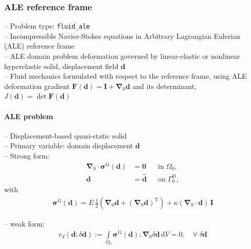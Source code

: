 \documentclass[a4paper,12pt]{report}
\newcommand{\bs}[1]{\boldsymbol{#1}}
\newcommand{\Om}{\mathit{\Omega}}
\newcommand{\Gm}{\mathit{\Gamma}}
\begin{document}
\subsubsection{ALE reference frame}

-- Problem type: \verb.fluid_ale.\\

-- Incompressible Navier-Stokes equations in Arbitrary Lagrangian Eulerian (ALE) reference frame\\

-- ALE domain problem deformation governed by linear-elastic or nonlinear hyperelastic solid, displacement field $\bs{d}$\\

-- Fluid mechanics formulated with respect to the reference frame, using ALE deformation gradient $\bs{F}(\bs{d}) = \bs{I} + \bs{\nabla}_0\bs{d}$ and its determinant, $J(\bs{d})=\det \bs{F}(\bs{d})$\\

\paragraph{ALE problem}

-- Displacement-based quasi-static solid\\

-- Primary variable: domain displacement $\bs{d}$\\

-- Strong form:
\begin{align}
\bs{\nabla}_{0} \cdot \bs{\sigma}^{\mathrm{G}}(\bs{d}) &= \bs{0} &&\text{in} \; \mathit{\Om}_0, \label{eq:divsigma_ale} \\
\bs{d} &= \hat{\bs{d}} &&\text{on} \; \mathit{\Gm}_0^{\mathrm{D}}, \label{eq:dbc_ale}
\end{align}
with
\begin{align}
\bs{\sigma}^{\mathrm{G}}(\bs{d}) = E \,\frac{1}{2}\left(\bs{\nabla}_0\bs{d} + (\bs{\nabla}_0\bs{d})^{\mathrm{T}}\right) + \kappa \left(\bs{\nabla}_0 \cdot \bs{d}\right)\,\bs{I}
\end{align}

-- weak form:
\begin{align}
r_{d}(\bs{d};\delta\bs{d}) := \int\limits_{\Om_0}\bs{\sigma}^{\mathrm{G}}(\bs{d}) : \bs{\nabla}_{0}\delta\bs{d}\,\mathrm{d}V = 0, \quad \forall \; \delta\bs{d} \label{eq:r_d}
\end{align}
\end{document}
